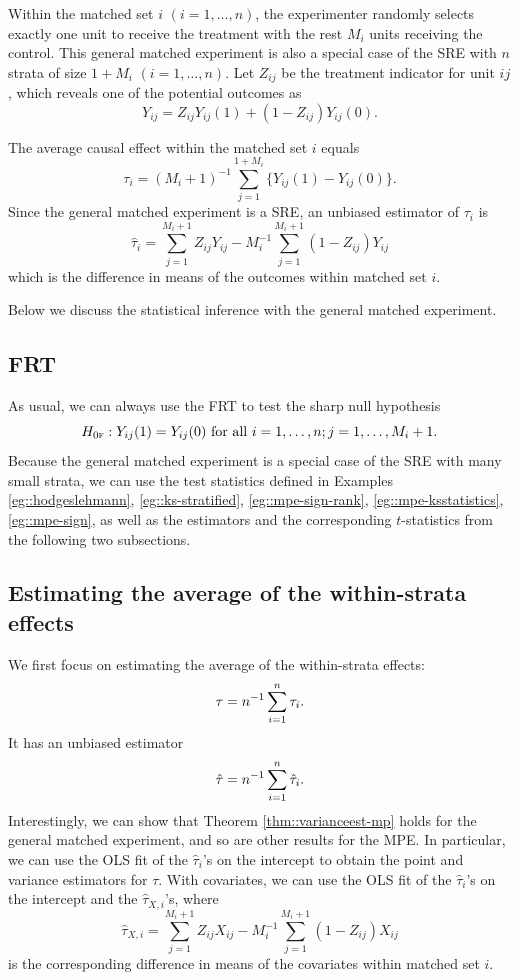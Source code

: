 Within the matched set $i$ $(i=1, \ldots, n)$, the experimenter randomly selects exactly one unit to receive the treatment with the rest $M_i$ units receiving the control.
This general matched experiment is also a special case of the SRE with $n$ strata of size $1+M_i$ $(i=1, \ldots, n)$. 
Let $Z_{ij}$ be the treatment indicator for unit $ij$, which reveals one of the potential outcomes as
$$
Y_{ij} = Z_{ij} Y_{ij}(1) + (1-Z_{ij}) Y_{ij}(0) . 
$$ 

The average causal effect within the matched set $i$ equals
$$
\tau_i = (M_i + 1)^{-1} \sum_{j=1}^{1+M_i} \{ Y_{ij}(1)-Y_{ij}(0) \}. 
$$
Since the general matched experiment is a SRE, an unbiased estimator of $\tau_i $ is 
$$
\hat \tau_i = \sum_{j=1}^{M_i + 1} Z_{ij} Y_{ij} - M_i^{-1} \sum_{j=1}^{M_i+1} (1-Z_{ij}) Y_{ij}
$$
which is the difference in means of the outcomes within matched set $i$. 

Below we discuss the statistical inference with the general matched experiment. 


\subsection{FRT}

As usual, we can always use the FRT to test the sharp null hypothesis
$$
H_{0\textsc{f}}: Y_{ij}(1) = Y_{ij}(0)  \text{ for all }  i=1,\ldots, n; j=1,\ldots, M_i+1. 
$$
Because the general matched experiment is a special case of the SRE with many small strata, we can use the test statistics defined in Examples \ref{eg::hodgeslehmann}, \ref{eg::ks-stratified}, \ref{eg::mpe-sign-rank}, \ref{eg::mpe-ksstatistics}, \ref{eg::mpe-sign}, as well as the estimators and the corresponding $t$-statistics from the following two subsections. 



\subsection{Estimating the average of the within-strata effects}


We first focus on estimating the average of the within-strata effects: 
$$
\tau = n^{-1} \sum_{i=1}^n \tau_i .
$$
It has an unbiased estimator 
$$
\hat\tau = n^{-1} \sum_{i=1}^n \hat \tau_i . 
$$
Interestingly, we can show that Theorem \ref{thm::varianceest-mp} holds for the general matched experiment, and so are other results for the MPE. In particular, we can use the OLS fit of the $\hat \tau_i $'s on the intercept to obtain the point and variance estimators for $\tau$. With covariates, we can use the OLS fit of the $\hat \tau_i $'s on the intercept and the $\hat\tau_{X,i}$'s, where
$$
\hat \tau_{X,i} = \sum_{j=1}^{M_i + 1} Z_{ij} X_{ij} - M_i^{-1} \sum_{j=1}^{M_i+1} (1-Z_{ij}) X_{ij}
$$
is the corresponding difference in means of the covariates within matched set $i$. 



